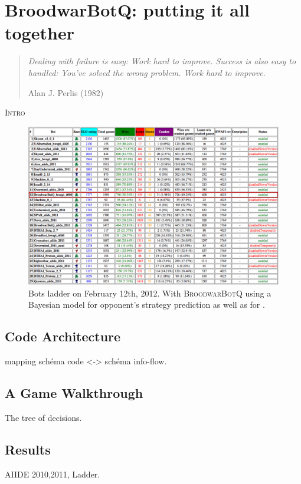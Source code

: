 \chapter{BroodwarBotQ: putting it all together}

\begin{quotation}
\textit{Dealing with failure is easy: Work hard to improve. Success is also easy to handled: You've solved the wrong problem. Work hard to improve.}\\
\begin{flushright}Alan J. Perlis (1982)\end{flushright}
\end{quotation}

\lettrine{I}{ntro}

\chaptertoc

\begin{figure}
\includegraphics[width=1.0\columnwidth]{images/ladder_2012-02-12.png}
\caption{Bots ladder on February 12th, 2012. With \textsc{BroodwarBotQ} using a Bayesian model for opponent's strategy prediction as well as for .}
\end{figure}

\section{Code Architecture}
mapping schéma code <-> schéma info-flow.

\section{A Game Walkthrough}
The tree of decisions.

\section{Results}
AIIDE 2010,2011, Ladder.


